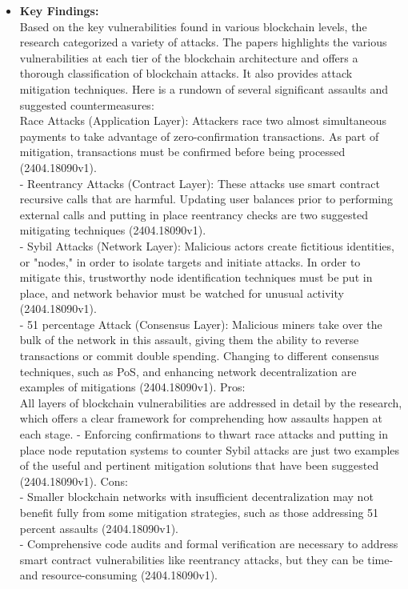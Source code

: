 \documentclass[12pt,a4paper]{article}
\begin{document}
\begin{itemize}
\begin{itemize}
        \item \textbf{Key Findings:} \\
Based on the key vulnerabilities found in various blockchain levels, the research
categorized a variety of attacks.
The papers highlights the various vulnerabilities at
each tier of the blockchain architecture and offers a thorough classification of
blockchain attacks. It also provides attack mitigation techniques. Here is a rundown of
several significant assaults and suggested countermeasures:
\\
Race Attacks (Application Layer): Attackers race two almost simultaneous payments to
take advantage of zero-confirmation transactions. As part of mitigation, transactions
must be confirmed before being processed (2404.18090v1). 
\\
- Reentrancy Attacks (Contract Layer): These attacks use smart contract
recursive calls that are harmful. Updating user balances prior to performing
external calls and putting in place reentrancy checks are two suggested
mitigating techniques (2404.18090v1).
\\
- Sybil Attacks (Network Layer): Malicious actors create fictitious identities, or
"nodes," in order to isolate targets and initiate attacks. In order to mitigate this,
trustworthy node identification techniques must be put in place, and network
behavior must be watched for unusual activity (2404.18090v1).
\\
- 51 percentage Attack (Consensus Layer): Malicious miners take over the bulk of the
network in this assault, giving them the ability to reverse transactions or commit
double spending. Changing to different consensus techniques, such as PoS, and
enhancing network decentralization are examples of mitigations (2404.18090v1).
Pros:
\\
All layers of blockchain vulnerabilities are addressed in detail by the research, which
offers a clear framework for comprehending how assaults happen at each stage.
- Enforcing confirmations to thwart race attacks and putting in place node reputation
systems to counter Sybil attacks are just two examples of the useful and pertinent
mitigation solutions that have been suggested (2404.18090v1).
Cons:
\\
- Smaller blockchain networks with insufficient decentralization may not benefit
fully from some mitigation strategies, such as those addressing 51 percent assaults
(2404.18090v1).
\\
- Comprehensive code audits and formal verification are necessary to address
smart contract vulnerabilities like reentrancy attacks, but they can be time- and
resource-consuming (2404.18090v1).
\end{itemize}


\end{itemize}
\end{document}
